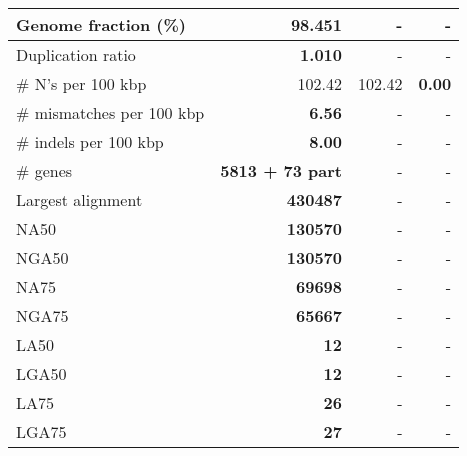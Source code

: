 \documentclass[12pt,a4paper]{article}
\begin{document}
\begin{table}[ht]
\begin{center}
\begin{tabular}{|l*{3}{|r}|}
Genome fraction (\%) & {\bf 98.451} & - & - \\ \hline
Duplication ratio & {\bf 1.010} & - & - \\ \hline
\# N's per 100 kbp & 102.42 & 102.42 & {\bf 0.00} \\ \hline
\# mismatches per 100 kbp & {\bf 6.56} & - & - \\ \hline
\# indels per 100 kbp & {\bf 8.00} & - & - \\ \hline
\# genes & {\bf 5813 + 73 part} & - & - \\ \hline
Largest alignment & {\bf 430487} & - & - \\ \hline
NA50 & {\bf 130570} & - & - \\ \hline
NGA50 & {\bf 130570} & - & - \\ \hline
NA75 & {\bf 69698} & - & - \\ \hline
NGA75 & {\bf 65667} & - & - \\ \hline
LA50 & {\bf 12} & - & - \\ \hline
LGA50 & {\bf 12} & - & - \\ \hline
LA75 & {\bf 26} & - & - \\ \hline
LGA75 & {\bf 27} & - & - \\ \hline
\end{tabular}
\end{center}
\end{table}
\end{document}
